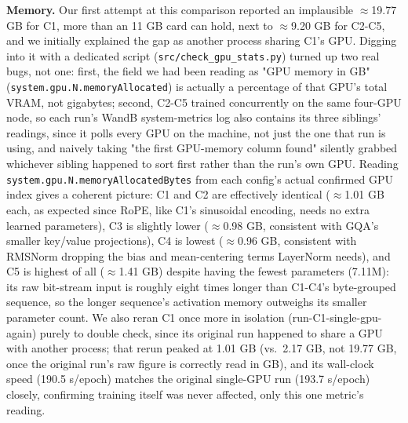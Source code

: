 \documentclass[12pt,a4paper]{article}
\begin{document}
\textbf{Memory.} Our first attempt at this comparison reported an implausible $\approx$19.77 GB for C1, more than an 11 GB card can hold, next to $\approx$9.20 GB for C2-C5, and we initially explained the gap as another process sharing C1's GPU. Digging into it with a dedicated script (\texttt{src/check\_gpu\_stats.py}) turned up two real bugs, not one: first, the field we had been reading as "GPU memory in GB" (\texttt{system.gpu.N.memoryAllocated}) is actually a percentage of that GPU's total VRAM, not gigabytes; second, C2-C5 trained concurrently on the same four-GPU node, so each run's WandB system-metrics log also contains its three siblings' readings, since it polls every GPU on the machine, not just the one that run is using, and naively taking "the first GPU-memory column found" silently grabbed whichever sibling happened to sort first rather than the run's own GPU. Reading \texttt{system.gpu.N.memoryAllocatedBytes} from each config's actual confirmed GPU index gives a coherent picture: C1 and C2 are effectively identical ($\approx$1.01 GB each, as expected since RoPE, like C1's sinusoidal encoding, needs no extra learned parameters), C3 is slightly lower ($\approx$0.98 GB, consistent with GQA's smaller key/value projections), C4 is lowest ($\approx$0.96 GB, consistent with RMSNorm dropping the bias and mean-centering terms LayerNorm needs), and C5 is highest of all ($\approx$1.41 GB) despite having the fewest parameters (7.11M): its raw bit-stream input is roughly eight times longer than C1-C4's byte-grouped sequence, so the longer sequence's activation memory outweighs its smaller parameter count. We also reran C1 once more in isolation (run-C1-single-gpu-again) purely to double check, since its original run happened to share a GPU with another process; that rerun peaked at 1.01 GB (vs.\ 2.17 GB, not 19.77 GB, once the original run's raw figure is correctly read in GB), and its wall-clock speed (190.5 s/epoch) matches the original single-GPU run (193.7 s/epoch) closely, confirming training itself was never affected, only this one metric's reading.
\end{document}
